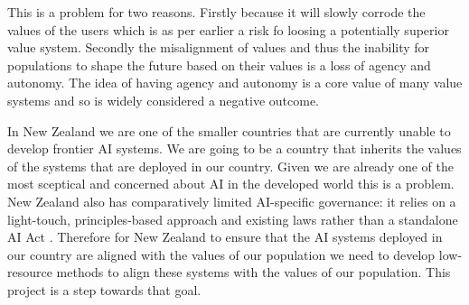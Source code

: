 This is a problem for two reasons. Firstly because it will slowly corrode the values of the users which is as per earlier a risk fo loosing a potentially superior value system. Secondly the misalignment of values and thus the inability for populations to shape the future based on their values is a loss of agency and autonomy. The idea of having agency and autonomy is a core value of many value systems and so is widely considered a negative outcome.

In New Zealand we are one of the smaller countries that are currently unable to develop frontier AI systems. We are going to be a country that inherits the values of the systems that are deployed in our country. Given we are already one of the most sceptical and concerned about AI in the developed world \cite{TrustAttitudesUse,GlobalAttitudesAI2026} this is a problem. New Zealand also has comparatively limited AI-specific governance: it relies on a light-touch, principles-based approach and existing laws rather than a standalone AI Act \cite{erdelyiAIRegulationStill2024,NewZealandCreated}. Therefore for New Zealand to ensure that the AI systems deployed in our country are aligned with the values of our population we need to develop low-resource methods to align these systems with the values of our population. This project is a step towards that goal.